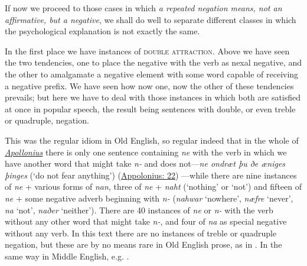 If now we proceed to those cases in which \textit{a repeated negation means, not an affirmative, but a negative}, we shall do well to separate different classes in which the psychological explanation is not exactly the same.

In the first place we have instances of \textsc{double attraction}. %
Above we have seen the two tendencies, one to place the negative with the verb as nexal negative, and the other to amalgamate a negative element with some word capable of receiving a negative prefix. We have seen how now one, now the other of these tendencies prevails; but here we have to deal with those instances in which both are satisfied at once in popular speech, the result being sentences with double, or even treble or quadruple, negation.

This was the regular idiom in Old English, so regular indeed that in the whole of \href{https://archive.org/details/anglosaxonversi00thorgoog}{\textit{Apollonius}} there is only one sentence containing \textit{ne} with the verb in which we have another word that might take \textit{n-} and does not---\textit{ne ondræt þu ðe æniges þinges} (`do not fear anything') (\href{https://archive.org/details/anglosaxonversi00thorgoog/page/n32/mode/2up?q=%22ne+ondrset+fu+t%24e+seniges%22&view=theater}{Appolonius: 22})%
---while there are nine instances of \textit{ne} + various forms of \textit{nan}, three of \textit{ne} + \textit{naht} (`nothing' or `not') and fifteen of \textit{ne} + some negative adverb beginning with \textit{n-} (\textit{nahwar} `nowhere', \textit{næfre} `never', \textit{na} `not', \textit{naðer} `neither'). There are 40 instances of \textit{ne} or \textit{n-} with the verb without any other word that might take \mbox{\textit{n-},} and four of \textit{na} as special negative without any verb. In this text there are no instances of treble or quadruple negation, but these are by no means rare in Old English prose, as in  . In the same way in Middle English, e.g. .

